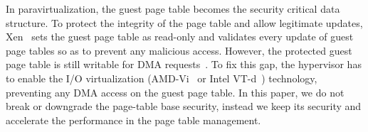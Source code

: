 


In paravirtualization, the guest page table becomes the security critical data structure.
To protect the integrity of the page table and allow legitimate updates, Xen~\cite{barham2003xen} sets the guest page table as read-only and validates every update of guest page tables so as to prevent any malicious access.
However, the protected guest page table is still writable for DMA requests~\cite{disaggregation,adams2006comparison}.
To fix this gap, the hypervisor has to enable the I/O virtualization (AMD-Vi~\cite{amdvt} or Intel VT-d~\cite{intelvt}) technology, preventing any DMA access on the guest page table.
In this paper, we do not break or downgrade the page-table base security, instead we keep its security and accelerate the performance in the page table management.


